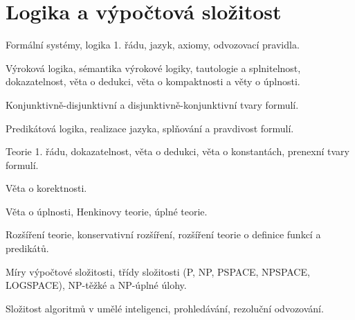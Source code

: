 \newpage
\section{Logika a výpočtová složitost}
\begin{pozadavky}
\begin{pitemize}
\item Formální systémy, logika 1. řádu, jazyk, axiomy, odvozovací pravidla.
\item Výroková logika, sémantika výrokové logiky, tautologie a splnitelnost, dokazatelnost, věta o dedukci, věta o kompaktnosti a věty o úplnosti.
\item Konjunktivně-disjunktivní a disjunktivně-konjunktivní tvary formulí.
\item Predikátová logika, realizace jazyka, splňování a pravdivost formulí.
\item Teorie 1. řádu, dokazatelnost, věta o dedukci, věta o konstantách, prenexní tvary formulí.
\item Věta o korektnosti.
\item Věta o úplnosti, Henkinovy teorie, úplné teorie.
\item Rozšíření teorie, konservativní rozšíření, rozšíření teorie o definice funkcí a predikátů.
\item Míry výpočtové složitosti, třídy složitosti (P, NP, PSPACE, NPSPACE, LOGSPACE), NP-těžké a NP-úplné úlohy.
\item Složitost algoritmů v umělé inteligenci, prohledávání, rezoluční odvozování.
\end{pitemize}
\end{pozadavky}









